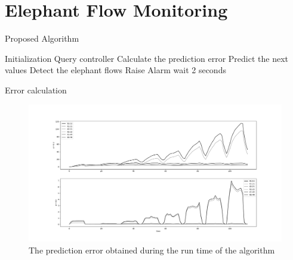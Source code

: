 \documentclass{beamer}
\begin{document}
\section{Elephant Flow Monitoring}

\begin{frame}{Proposed Algorithm}
    \begin{algorithm}[H]
        \caption{Elephant Detection Algorithm - High Level} \label{alg:high_level}
        \begin{algorithmic}[1]
                \State Initialization
                \pause
                \Loop
                    \State Query controller
                    \pause
                    \State Calculate the prediction error
                    \pause
                    \State Predict the next values
                    \pause
                    \State Detect the elephant flows
                        \State Raise Alarm
                    \EndIf
                    \State wait 2 seconds
                    \pause
                \EndLoop
            \EndProcedure 
           \end{algorithmic}
    \end{algorithm}
\end{frame}

\begin{frame}{Error calculation}
    \begin{figure}
        \includegraphics[width=1\textwidth]{meter_eleph/error_plot_sse}
        \caption{The prediction error obtained during the run time of the algorithm}
    \end{figure}
\end{frame}
\end{document}
